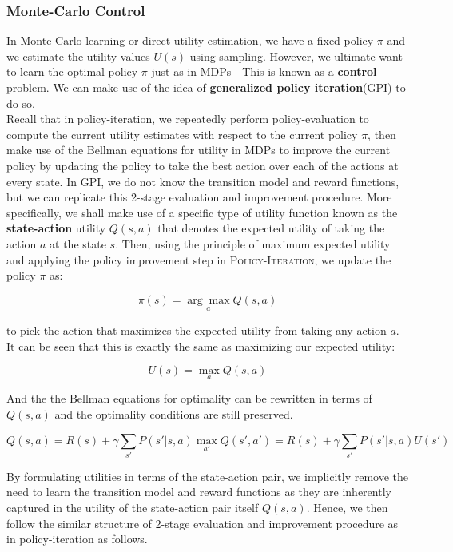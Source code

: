 \documentclass[11pt]{article}
\begin{document}
\subsubsection{Monte-Carlo Control}

In Monte-Carlo learning or direct utility estimation, we have a fixed policy $\pi$ and we estimate the utility values $U(s)$ using sampling. However, we ultimate want to learn the optimal policy $\pi$ just as in MDPs - This is known as a \textbf{control} problem. We can make use of the idea of \textbf{generalized policy iteration}(GPI) to do so.\\

Recall that in policy-iteration, we repeatedly perform policy-evaluation to compute the current utility estimates with respect to the current policy $\pi$, then make use of the Bellman equations for utility in MDPs to improve the current policy by updating the policy to take the best action over each of the actions at every state. In GPI, we do not know the transition model and reward functions, but we can replicate this 2-stage evaluation and improvement procedure. More specifically, we shall make use of a specific type of utility function known as the \textbf{state-action} utility $Q(s, a)$ that denotes the expected utility of taking the action $a$ at the state $s$. Then, using the principle of maximum expected utility and applying the policy improvement step in \textsc{Policy-Iteration}, we update the policy $\pi$ as:

$$
\pi(s) = \underset{a}{\arg\max} Q(s, a)
$$

to pick the action that maximizes the expected utility from taking any action $a$. It can be seen that this is exactly the same as maximizing our expected utility:

$$
U(s) = \max_a Q(s, a)
$$

And the the Bellman equations for optimality can be rewritten in terms of $Q(s, a)$ and the optimality conditions are still preserved.

$$
Q(s, a) = R(s) + \gamma \sum_{s'} P(s' | s, a) \max_{a'} Q(s', a') = R(s) + \gamma \sum_{s'} P(s' | s, a) U(s')
$$

By formulating utilities in terms of the state-action pair, we implicitly remove the need to learn the transition model and reward functions as they are inherently captured in the utility of the state-action pair itself $Q(s, a)$. Hence, we then follow the similar structure of 2-stage evaluation and improvement procedure as in policy-iteration as follows.
\end{document}
